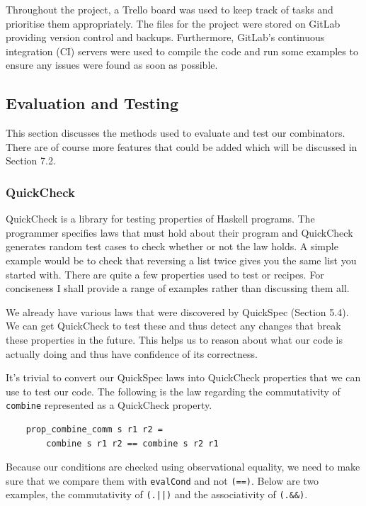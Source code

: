 \documentclass[11pt]{article}
\begin{document}
Throughout the project, a Trello board was used to keep track of tasks
and prioritise them appropriately. The files for the project were stored
on GitLab providing version control and backups. Furthermore, GitLab's
continuous integration (CI) servers were used to compile the code and run
some examples to ensure any issues were found as soon as possible.

\subsection{Evaluation and Testing}

This section discusses the methods used to evaluate and test our
combinators. There are of course more features that could be
added which will be discussed in Section 7.2.

\subsubsection{QuickCheck}

QuickCheck \cite{quickcheck} is a library for testing properties of Haskell
programs. The programmer specifies laws that must hold about their program
and QuickCheck generates random test cases to check whether or not the
law holds. A simple example would be to check that reversing a list
twice gives you the same list you started with. There are quite a few properties
used to test or recipes. For conciseness I shall provide a range of examples
rather than discussing them all.

\medbreak

We already have various laws that were discovered by QuickSpec
(Section 5.4). We can get QuickCheck to test these and thus detect any changes
that break these properties in the future. This helps us to reason about what our code
is actually doing and thus have confidence of its correctness.

\medbreak

It's trivial to convert our QuickSpec laws into QuickCheck properties that
we can use to test our code. The following is the law regarding the commutativity
of \texttt{combine} represented as a QuickCheck property.

\begin{lstlisting}
    prop_combine_comm s r1 r2 =
        combine s r1 r2 == combine s r2 r1
\end{lstlisting}

Because our conditions are checked using observational equality, we need
to make sure that we compare them with \texttt{evalCond} and not \texttt{(==)}.
Below are two examples, the commutativity of \texttt{(.||)} and the associativity
of \texttt{(.\&\&)}.
\end{document}
